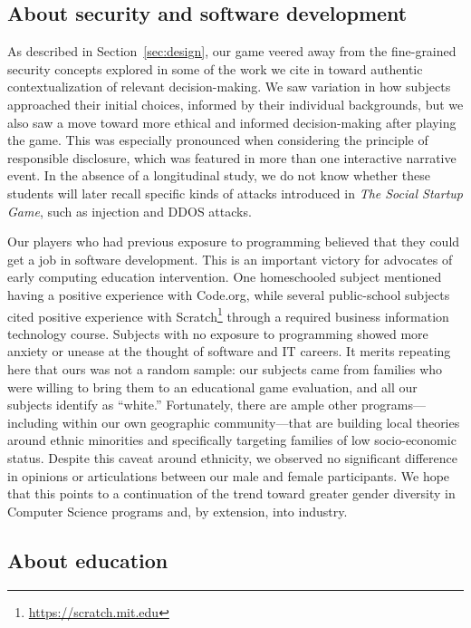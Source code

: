 \documentclass[letterpaper]{article}
\begin{document}
\subsection{About security and software development}

As described in Section~\ref{sec:design}, our game veered away
from the fine-grained security concepts explored 
in some of the work we cite in \citet{Gestwicki2015}
 toward
authentic contextualization of relevant decision-making.
We saw variation in how subjects approached their initial choices,
informed by their individual backgrounds, but we also saw a move toward
more ethical and informed decision-making after playing the game.
This was especially pronounced when considering the principle
of responsible disclosure, which was featured in more than
one interactive narrative event.
In the absence of a longitudinal study,
we do not know whether these students will later recall specific
kinds of attacks introduced in \textit{The Social Startup Game},
such as injection and DDOS attacks.

Our players who had previous exposure to programming believed that
they could get a job in software development. This is an important
victory for advocates of early computing education intervention.
One homeschooled subject mentioned having a positive experience with
Code.org, while several public-school subjects cited positive experience
with Scratch\footnote{\url{https://scratch.mit.edu}} through a required
business information technology course. Subjects with no exposure to
programming showed more anxiety or unease at the thought of software
and IT careers. It merits repeating here that ours was
not a random sample: our subjects came from families who were willing
to bring them to an educational game evaluation, and all our subjects
identify as ``white.'' Fortunately, there are ample other programs---including
within our own geographic community---that are building local theories around
ethnic minorities and specifically targeting families of low socio-economic 
status.
Despite this caveat around ethnicity, we observed no significant difference
in opinions or articulations between our male and female participants.
We hope that this points to a continuation of the trend toward greater
gender diversity in Computer Science programs and, by extension, into
industry.


\subsection{About education}
\end{document}
